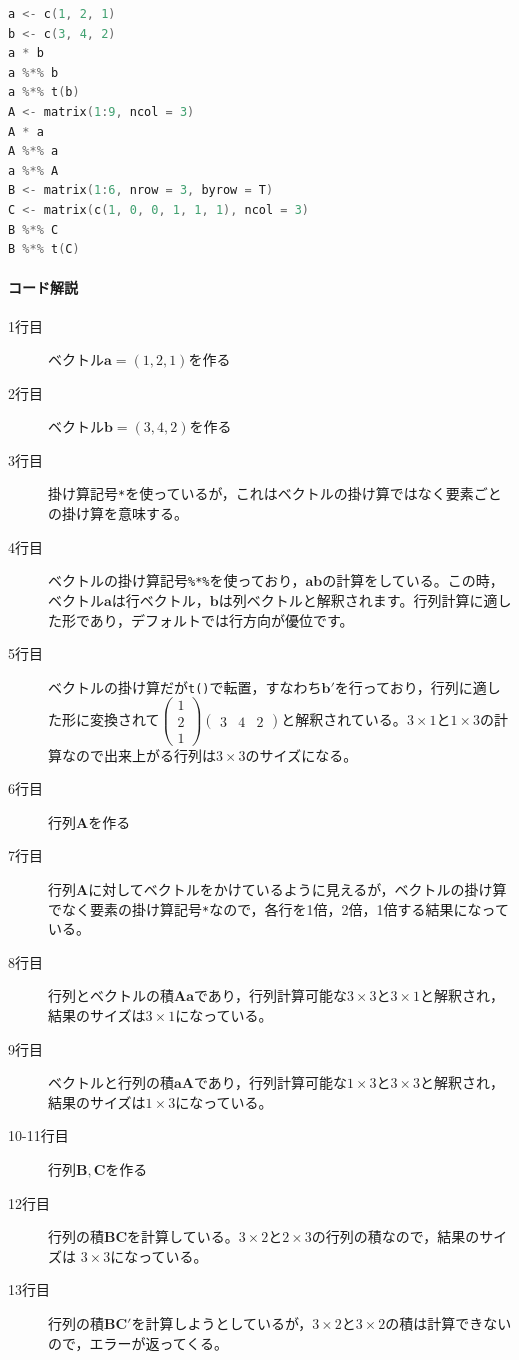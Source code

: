 \documentclass{ltjsbook}
\begin{document}
\begin{lstlisting}[language=c++,label={code::09_03},caption={行列の積}]
a <- c(1, 2, 1)
b <- c(3, 4, 2)
a * b
a %*% b
a %*% t(b)
A <- matrix(1:9, ncol = 3)
A * a
A %*% a
a %*% A
B <- matrix(1:6, nrow = 3, byrow = T)
C <- matrix(c(1, 0, 0, 1, 1, 1), ncol = 3)
B %*% C
B %*% t(C)
\end{lstlisting}
\paragraph{コード解説}
\begin{description}
    \item[1行目] ベクトル$\bm{a}=(1,2,1)$を作る
    \item[2行目] ベクトル$\bm{b}=(3,4,2)$を作る
    \item[3行目] 掛け算記号\verb|*|を使っているが，これはベクトルの掛け算ではなく要素ごとの掛け算を意味する。
    \item[4行目] ベクトルの掛け算記号\verb|%*%|を使っており，$\bm{ab}$の計算をしている。この時，ベクトル$\bm{a}$は行ベクトル，$\bm{b}$は列ベクトルと解釈されます。行列計算に適した形であり，デフォルトでは行方向が優位です。
    \item[5行目] ベクトルの掛け算だが\texttt{t()}で転置，すなわち$\bm{b}'$を行っており，行列に適した形に変換されて$\begin{pmatrix}1\\2\\1\end{pmatrix}\begin{pmatrix}3&4&2\end{pmatrix}$と解釈されている。$3\times1$と$1\times3$の計算なので出来上がる行列は$3\times3$のサイズになる。
    \item[6行目] 行列$\bm{A}$を作る
    \item[7行目] 行列$\bm{A}$に対してベクトルをかけているように見えるが，ベクトルの掛け算でなく要素の掛け算記号\verb|*|なので，各行を1倍，2倍，1倍する結果になっている。
    \item[8行目] 行列とベクトルの積$\bm{Aa}$であり，行列計算可能な$3\times3$と$3\times1$と解釈され，結果のサイズは$3 \times 1$になっている。
    \item[9行目] ベクトルと行列の積$\bm{aA}$であり，行列計算可能な$1 \times 3$と$3 \times 3$と解釈され，結果のサイズは$1 \times 3$になっている。
    \item[10-11行目] 行列$\bm{B,C}$を作る
    \item[12行目] 行列の積$\bm{BC}$を計算している。$3\times2$と$2\times3$の行列の積なので，結果のサイズは $3\times3$になっている。
    \item[13行目] 行列の積$\bm{BC'}$を計算しようとしているが，$3\times2$と$3\times2$の積は計算できないので，エラーが返ってくる。
\end{description}
\end{document}
